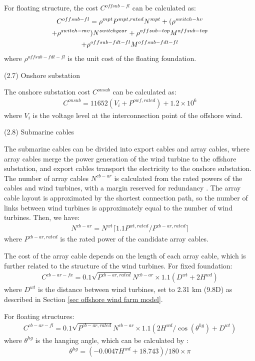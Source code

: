 \documentclass[sn-mathphys,Numbered]{sn-jnl}%
\theoremstyle{plain}%
\theoremstyle{definition}%
\theoremstyle{remark}%
\begin{document}
For floating structure, the cost $C^{offsub-fl}$ can be calculated as:
\begin{gather}
    C^{offsub-fl} = \rho^{mpt} P^{mpt,rated} N^{mpt} + (\rho^{switch-hv} 
\notag\\
    + \rho^{switch-mv}) N^{switchgear} + \rho^{offsub-top} M^{offsub-top}
\notag\\
    + \rho^{offsub-fdt-fl} M^{offsub-fdt-fl}
\end{gather}
where $\rho^{offsub-fdt-fl}$ is the unit cost of the floating foundation.

(2.7) Onshore substation

The onshore substation cost $C^{onsub}$ can be calculated as:
\begin{gather}
    C^{onsub} = 11652(V_i+P^{owf,rated}) + 1.2 \times 10^6
\end{gather}
where $V_i$ is the voltage level at the interconnection point of the offshore wind.

(2.8) Submarine cables

The submarine cables can be divided into export cables and array cables, where array cables merge the power generation of the wind turbine to the offshore substation, and export cables transport the electricity to the onshore substation.
The number of array cables $N^{cb-ar}$ is calculated from the rated powers of the cables and wind turbines, with a margin reserved for redundancy \cite{guo2023grid}. The array cable layout is approximated by the shortest connection path, so the number of links between wind turbines is approximately equal to the number of wind turbines. Then, we have:
\begin{gather}
    N^{cb-ar} = N^{wt} \lceil 1.1 P^{wt,rated} / P^{cb-ar,rated} \rceil
\end{gather}
where $P^{cb-ar,rated}$ is the rated power of the candidate array cables.

The cost of the array cable depends on the length of each array cable, which is further related to the structure of the wind turbines. For fixed foundation:
\begin{gather}
    C^{cb-ar-fx} = 0.1 \sqrt{P^{cb-ar,rated}} N^{cb-ar} \times 1.1 (D^{wt}+2H^{wd}) 
\end{gather}
where $D^{wt}$ is the distance between wind turbines, set to 2.31 km (9.8D) as described in Section \ref{sec offshore wind farm model}.

For floating structures:
\begin{gather}
    C^{cb-ar-fl} = 0.1 \sqrt{P^{cb-ar,rated}} N^{cb-ar} \times 1.1 (2H^{wd}/\cos{(\theta^{hg})} + D^{wt})
\end{gather}
where $\theta^{hg}$ is the hanging angle, which can be calculated by \cite{NRELOffshoreBalance}:
\begin{gather}
    \theta^{hg} = (-0.0047H^{wd}+18.743)/180\times \pi
\end{gather}
\end{document}
